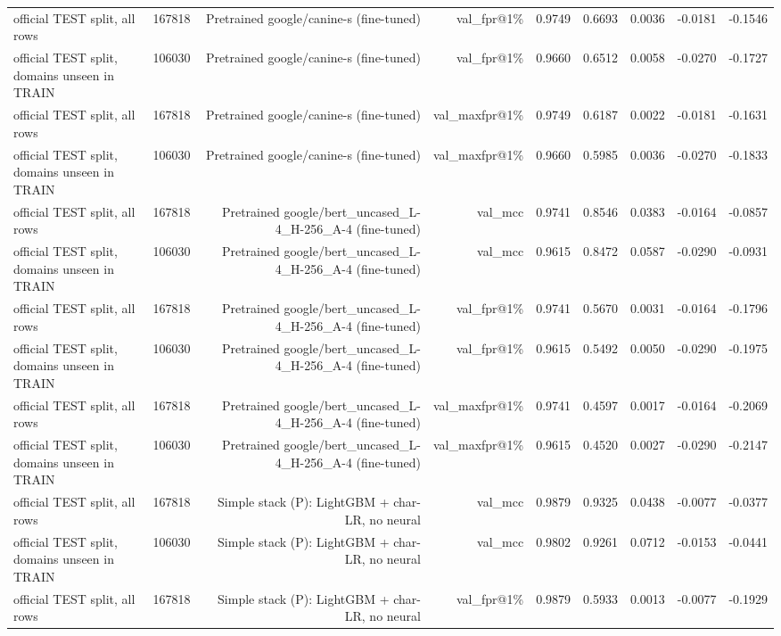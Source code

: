 \begin{table}[t]
\begin{tabular}{llrrrrrrr}
official TEST split, all rows & 167818 & Pretrained google/canine-s (fine-tuned) & val\_fpr@1\% & 0.9749 & 0.6693 & 0.0036 & -0.0181 & -0.1546 \\
official TEST split, domains unseen in TRAIN & 106030 & Pretrained google/canine-s (fine-tuned) & val\_fpr@1\% & 0.9660 & 0.6512 & 0.0058 & -0.0270 & -0.1727 \\
official TEST split, all rows & 167818 & Pretrained google/canine-s (fine-tuned) & val\_maxfpr@1\% & 0.9749 & 0.6187 & 0.0022 & -0.0181 & -0.1631 \\
official TEST split, domains unseen in TRAIN & 106030 & Pretrained google/canine-s (fine-tuned) & val\_maxfpr@1\% & 0.9660 & 0.5985 & 0.0036 & -0.0270 & -0.1833 \\
official TEST split, all rows & 167818 & Pretrained google/bert\_uncased\_L-4\_H-256\_A-4 (fine-tuned) & val\_mcc & 0.9741 & 0.8546 & 0.0383 & -0.0164 & -0.0857 \\
official TEST split, domains unseen in TRAIN & 106030 & Pretrained google/bert\_uncased\_L-4\_H-256\_A-4 (fine-tuned) & val\_mcc & 0.9615 & 0.8472 & 0.0587 & -0.0290 & -0.0931 \\
official TEST split, all rows & 167818 & Pretrained google/bert\_uncased\_L-4\_H-256\_A-4 (fine-tuned) & val\_fpr@1\% & 0.9741 & 0.5670 & 0.0031 & -0.0164 & -0.1796 \\
official TEST split, domains unseen in TRAIN & 106030 & Pretrained google/bert\_uncased\_L-4\_H-256\_A-4 (fine-tuned) & val\_fpr@1\% & 0.9615 & 0.5492 & 0.0050 & -0.0290 & -0.1975 \\
official TEST split, all rows & 167818 & Pretrained google/bert\_uncased\_L-4\_H-256\_A-4 (fine-tuned) & val\_maxfpr@1\% & 0.9741 & 0.4597 & 0.0017 & -0.0164 & -0.2069 \\
official TEST split, domains unseen in TRAIN & 106030 & Pretrained google/bert\_uncased\_L-4\_H-256\_A-4 (fine-tuned) & val\_maxfpr@1\% & 0.9615 & 0.4520 & 0.0027 & -0.0290 & -0.2147 \\
official TEST split, all rows & 167818 & Simple stack (P): LightGBM + char-LR, no neural & val\_mcc & 0.9879 & 0.9325 & 0.0438 & -0.0077 & -0.0377 \\
official TEST split, domains unseen in TRAIN & 106030 & Simple stack (P): LightGBM + char-LR, no neural & val\_mcc & 0.9802 & 0.9261 & 0.0712 & -0.0153 & -0.0441 \\
official TEST split, all rows & 167818 & Simple stack (P): LightGBM + char-LR, no neural & val\_fpr@1\% & 0.9879 & 0.5933 & 0.0013 & -0.0077 & -0.1929 \\

\end{tabular}
\end{table}
